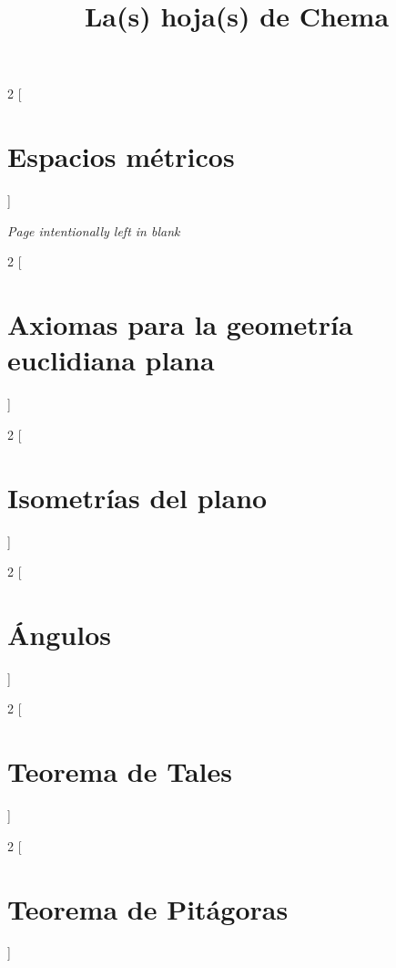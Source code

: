 \documentclass[a4paper, ]{article}
\title{\Huge{\vspace{-1em}La(s) hoja(s) de Chema}}
\author{}
\date{}
\begin{document}
		\maketitle

	\fontsize{12pt}{12pt}\selectfont
	\vspace*{-4em}
	
	\begin{multicols}{2}
	[
	\section{Espacios métricos}
	]
	
	\end{multicols}
	
	\pagebreak
	\textcolor{gris}{\textit{Page intentionally left in blank}}
	\newpage
	\pagebreak
	
	
	\begin{multicols*}{2}
	[\section{Axiomas para la geometría euclidiana plana}]
	\end{multicols*}\pagebreak


	\begin{multicols*}{2}
	[\section{Isometrías del plano}]
	\end{multicols*}\pagebreak
	
	
	\begin{multicols*}{2}
	[\section{Ángulos}]
	\end{multicols*}\pagebreak
	
		
	\begin{multicols*}{2}
	[\section{Teorema de Tales}]
	\end{multicols*}\pagebreak
	
	
	\begin{multicols*}{2}
	[\section{Teorema de Pitágoras}]
	\end{multicols*}\pagebreak
	
\end{document}
